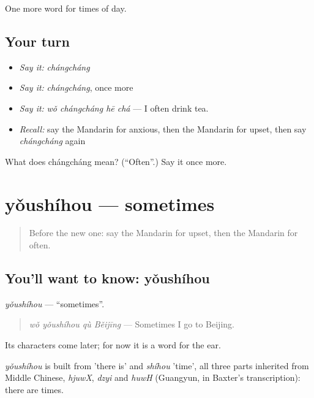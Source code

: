\begin{grammarlens}[title={What you've built}]
One more word for times of day.
\end{grammarlens}

\subsection*{Your turn}
\begin{itemize}
\raggedright
  \item \emph{Say it:} \emph{chángcháng}
  \item \emph{Say it:} \emph{chángcháng}, once more
  \item \emph{Say it:} \emph{wǒ chángcháng hē chá} — I often drink tea.
  \item \emph{Recall:} say the Mandarin for anxious, then the Mandarin for upset, then say \emph{chángcháng} again
\end{itemize}

\begin{tcolorbox}[breakable,colback=teal!4,colframe=teal!35!black,title={Before you move on}]
What does chángcháng mean? (\textquotedblleft{}Often\textquotedblright{}.) Say it once more.
\end{tcolorbox}
\section[yǒushíhou]{yǒushíhou — sometimes}

\label{lesson:ZH-C126-youshihou}



\begin{quote}
Before the new one: say the Mandarin for upset, then the Mandarin for often.
\end{quote}

\subsection*{You'll want to know: yǒushíhou}
\emph{yǒushíhou} — \textquotedblleft{}sometimes\textquotedblright{}.

\begin{quote}
\emph{wǒ yǒushíhou qù Běijīng} — Sometimes I go to Beijing.
\end{quote}

Its characters come later; for now it is a word for the ear.

\begin{cousinweb}
\emph{yǒushíhou} is built from  'there is' and \emph{shíhou} 'time', all three parts inherited from Middle Chinese, \emph{hjuwX}, \emph{dzyi} and \emph{huwH} (Guangyun, in Baxter's transcription): there are times.
\end{cousinweb}

